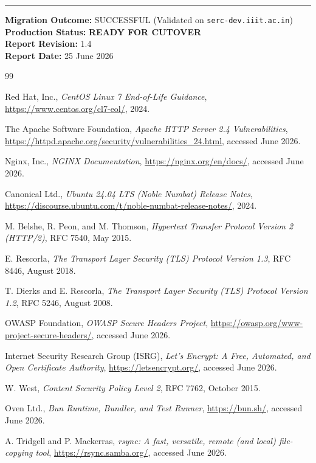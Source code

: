 \documentclass[11pt,a4paper,DIV=16,headings=normal,parskip=half]{scrartcl}
\begin{document}
\vspace{0.5cm}
\hrule
\vspace{0.3cm}

\textbf{Migration Outcome:} SUCCESSFUL (Validated on \texttt{serc-dev.iiit.ac.in}) \\
\textbf{Production Status:} \colorbox{highlightgreen}{\textbf{READY FOR CUTOVER}} \\
\textbf{Report Revision:} 1.4 \\
\textbf{Report Date:} 25 June 2026

\begin{thebibliography}{99}

Red Hat, Inc., \emph{CentOS Linux 7 End-of-Life Guidance}, \url{https://www.centos.org/cl7-eol/}, 2024.

The Apache Software Foundation, \emph{Apache HTTP Server 2.4 Vulnerabilities}, \url{https://httpd.apache.org/security/vulnerabilities_24.html}, accessed June 2026.

Nginx, Inc., \emph{NGINX Documentation}, \url{https://nginx.org/en/docs/}, accessed June 2026.

Canonical Ltd., \emph{Ubuntu 24.04 LTS (Noble Numbat) Release Notes}, \url{https://discourse.ubuntu.com/t/noble-numbat-release-notes/}, 2024.

M. Belshe, R. Peon, and M. Thomson, \emph{Hypertext Transfer Protocol Version 2 (HTTP/2)}, RFC 7540, May 2015.

E. Rescorla, \emph{The Transport Layer Security (TLS) Protocol Version 1.3}, RFC 8446, August 2018.

T. Dierks and E. Rescorla, \emph{The Transport Layer Security (TLS) Protocol Version 1.2}, RFC 5246, August 2008.

OWASP Foundation, \emph{OWASP Secure Headers Project}, \url{https://owasp.org/www-project-secure-headers/}, accessed June 2026.

Internet Security Research Group (ISRG), \emph{Let's Encrypt: A Free, Automated, and Open Certificate Authority}, \url{https://letsencrypt.org/}, accessed June 2026.

W. West, \emph{Content Security Policy Level 2}, RFC 7762, October 2015.

Oven Ltd., \emph{Bun Runtime, Bundler, and Test Runner}, \url{https://bun.sh/}, accessed June 2026.

A. Tridgell and P. Mackerras, \emph{rsync: A fast, versatile, remote (and local) file-copying tool}, \url{https://rsync.samba.org/}, accessed June 2026.

\end{thebibliography}
\end{document}
